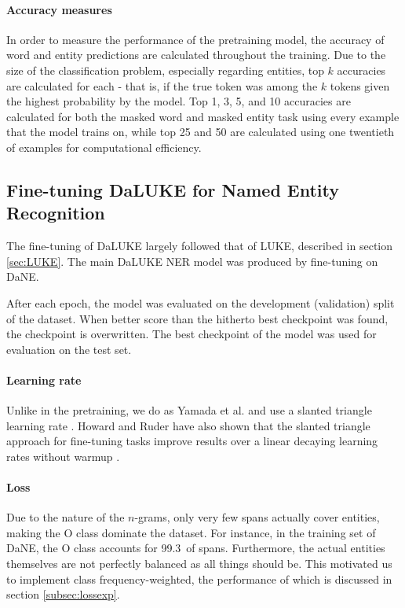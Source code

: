 \documentclass[main.tex]{subfiles}
\begin{document}
\paragraph{Accuracy measures}
In order to measure the performance of the pretraining model, the accuracy of word and entity predictions are calculated throughout the training.
Due to the size of the classification problem, especially regarding entities, top $ k $ accuracies are calculated for each - that is, if the true token was among the $ k $ tokens given the highest probability by the model.
Top 1, 3, 5, and 10 accuracies are calculated for both the masked word and masked entity task using every example that the model trains on, while top 25 and 50 are calculated using one twentieth of examples for computational efficiency.

\subsection{Fine-tuning DaLUKE for Named Entity Recognition}%
\label{sub:finetune-ner}
The fine-tuning of DaLUKE largely followed that of LUKE, described in section \ref{sec:LUKE}.
The main DaLUKE NER model was produced by fine-tuning on DaNE.

After each epoch, the model was evaluated on the development (validation) split of the dataset.
When better score than the hitherto best checkpoint was found, the checkpoint is overwritten.
The best checkpoint of the model was used for evaluation on the test set.

\paragraph{Learning rate}
Unlike in the pretraining, we do as Yamada et al. and use a slanted triangle learning rate \cite{yamada2020luke}.
Howard and Ruder have also shown that the slanted triangle approach for fine-tuning tasks improve results over a linear decaying learning rates without warmup \cite{howardruder2018universal}.

\paragraph{Loss}
Due to the nature of the $ n $-grams, only very few spans actually cover entities, making the O class dominate the dataset.
For instance, in the training set of DaNE, the O class accounts for 99.3\pro\ of spans.
Furthermore, the actual entities themselves are not perfectly balanced as all things should be.
This motivated us to implement class frequency-weighted, the performance of which is discussed in section \ref{subsec:lossexp}.
\end{document}
